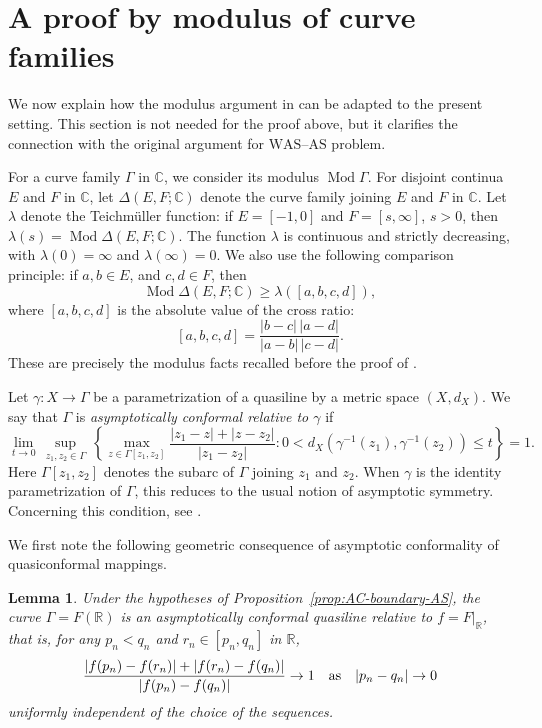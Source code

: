 \documentclass[11pt]{amsart}
\numberwithin{equation}{section}
\newtheorem{lemma}[theorem]{Lemma}
\theoremstyle{definition} %
\theoremstyle{remarkstyle}
\newcommand{\R}{\mathbb{R}}
\newcommand{\C}{\mathbb{C}}
\newcommand{\Mod}{\operatorname{Mod}}
\begin{document}
\section{A proof by modulus of curve families}\label{sec:a_proof_by_modulus_of_curve_families}

We now explain how the modulus argument in \cite[Theorem~3.1]{BraniaYang} can be adapted to the present setting.  
This section is not needed for the proof above, but it clarifies the connection with the original 
argument for $\mathrm{WAS}$--$\mathrm{AS}$ problem.

For a curve family $\Gamma$ in $\C$, we consider its modulus $\Mod \Gamma$.
For disjoint continua $E$ and $F$ in $\C$, let $\Delta(E,F;\C)$ denote the curve family joining $E$ and $F$ in $\C$.
Let $\lambda$ denote the Teichm\"uller function: if $E=[-1,0]$ and $F=[s,\infty]$, $s>0$, then $\lambda(s)=\Mod\Delta(E,F;\C)$.  
The function $\lambda$ is continuous and strictly decreasing, with $\lambda(0)=\infty$ and $\lambda(\infty)=0$.
We also use the following comparison principle: if $a,b\in E$, and $c,d\in F$, then
\begin{equation}\label{eq:Teich-comparison}
 \Mod\Delta(E,F;\C)\ge\lambda([a,b,c,d]),
\end{equation}
where $[a,b,c,d]$ is the absolute value of the cross ratio:
\[
 [a,b,c,d] =\frac{|b-c|\,|a-d|}{|a-b|\,|c-d|}.
\]
These are precisely the modulus facts recalled before the proof of \cite[Theorem~3.1]{BraniaYang}.

Let $\gamma\colon X\to\Gamma$ be a parametrization of a quasiline by a metric space $(X,d_X)$. 
We say that $\Gamma$ is \emph{asymptotically conformal relative to
$\gamma$} if
\[
\lim_{t\to 0}\,\sup_{z_1,z_2\in \Gamma}\,\left\{\max_{z\in\Gamma[z_1,z_2]}\frac{|z_1-z|+|z-z_2|}{|z_1-z_2|}:0<d_X(\gamma^{-1}(z_1),\gamma^{-1}(z_2))\leq t\right\}=1.
\]
Here $\Gamma[z_1,z_2]$ denotes the subarc of $\Gamma$ joining $z_1$ and $z_2$. 
When $\gamma$ is the identity parametrization of $\Gamma$, this reduces to the usual notion of asymptotic symmetry. 
Concerning this condition, see \cite{MT1}.

We first note the following geometric consequence of asymptotic conformality of quasiconformal mappings.

\begin{lemma}\label{lem:asymptotic-symmetry}
Under the hypotheses of Proposition~\ref{prop:AC-boundary-AS}, the curve $\Gamma=F(\R)$ is an asymptotically conformal quasiline relative to $f=F|_{\R}$, that is, for any $p_n<q_n$ and $r_n\in[p_n,q_n]$ in $\R$,
\[
 \frac{|f(p_n)-f(r_n)|+|f(r_n)-f(q_n)|}{|f(p_n)-f(q_n)|} \to 1 \quad {\rm as} \quad |p_n-q_n|\to 0
\]
uniformly independent of the choice of the sequences.
\end{lemma}
\end{document}

